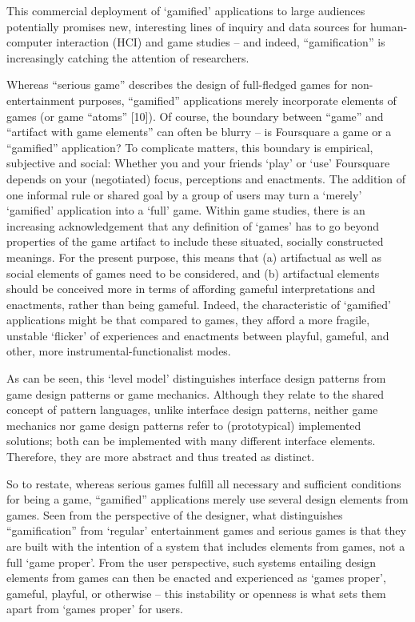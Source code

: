 This commercial deployment of `gamified' applications to large audiences potentially promises new, interesting lines of inquiry and data sources for human-computer interaction (HCI) and game studies – and indeed, ``gamification'' is increasingly catching the attention of researchers.

Whereas ``serious game'' describes the design of full-fledged games for non-entertainment purposes, ``gamified'' applications merely incorporate elements of games (or game ``atoms'' [10]). Of course, the boundary between ``game'' and ``artifact with game elements'' can often be blurry – is Foursquare a game or a ``gamified'' application? To complicate matters, this boundary is empirical, subjective and social: Whether you and your friends `play' or `use' Foursquare depends on your (negotiated) focus, perceptions and enactments. The addition of one informal rule or shared goal by a group of users may turn a `merely' `gamified' application into a `full' game. Within game studies, there is an increasing acknowledgement that any definition of `games' has to go beyond properties of the game artifact to include these situated, socially constructed meanings. For the present purpose, this means that (a) artifactual as well as social elements of games need to be considered, and (b) artifactual elements should be conceived more in terms of affording gameful interpretations and enactments, rather than being gameful. Indeed, the characteristic of `gamified' applications might be that compared to games, they afford a more fragile, unstable `flicker' of experiences and enactments between playful, gameful, and other, more instrumental-functionalist modes.


As can be seen, this ‘level model’ distinguishes interface design patterns from game design patterns or game mechanics. Although they relate to the shared concept of pattern languages, unlike interface design patterns, neither game mechanics nor game design patterns refer to (prototypical) implemented solutions; both can be implemented with many different interface elements. Therefore, they are more abstract and thus treated as distinct.

So to restate, whereas serious games fulfill all necessary and sufficient conditions for being a game, “gamified” applications merely use several design elements from games. Seen from the perspective of the designer, what distinguishes “gamification” from ‘regular’ entertainment games and serious games is that they are built with the intention of a system that includes elements from games, not a full ‘game proper’. From the user perspective, such systems entailing design elements from games can then be enacted and experienced as ‘games proper’, gameful, playful, or otherwise – this instability or openness is what sets them apart from ‘games proper’ for users.

